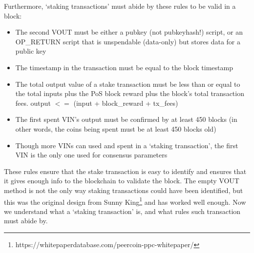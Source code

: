 Furthermore, ‘staking transactions’ must abide by these rules to be valid
in a block:
\begin{itemize}
	\item The second VOUT must be either a pubkey (not pubkeyhash!) script,
	or an OP\_RETURN script that is unspendable (data-only) but stores data
	for a public key
	\item The timestamp in the transaction must be equal to the block timestamp
	\item The total output value of a stake transaction must be less than or
	equal to the total inputs plus the PoS block reward plus the block's
	total transaction fees. output $<=$ (input + block\_reward + tx\_fees)
	\item The first spent VIN's output must be confirmed by at least 450
	blocks (in other words, the coins being spent must be at least 450
	blocks old)
	\item Though more VINs can used and spent in a ‘staking transaction’,
	the first VIN is the only one used for consensus parameters
\end{itemize}



These rules ensure that the stake transaction is easy to identify and
ensures that it gives enough info to the blockchain to validate the block.
The empty VOUT method is not the only way staking transactions could have
been identified, but this was the original design from Sunny
King\footnote{https://whitepaperdatabase.com/peercoin-ppc-whitepaper/}
and has worked well enough. Now we understand what a ‘staking transaction’
is, and what rules such transaction must abide by.



